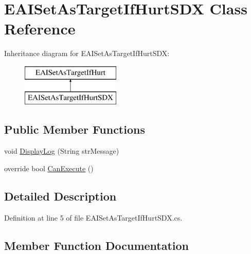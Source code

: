 \hypertarget{class_e_a_i_set_as_target_if_hurt_s_d_x}{}\section{E\+A\+I\+Set\+As\+Target\+If\+Hurt\+S\+DX Class Reference}
\label{class_e_a_i_set_as_target_if_hurt_s_d_x}
Inheritance diagram for E\+A\+I\+Set\+As\+Target\+If\+Hurt\+S\+DX\+:\begin{figure}[H]
\begin{center}
\leavevmode
\includegraphics[height=2.000000cm]{class_e_a_i_set_as_target_if_hurt_s_d_x}
\end{center}
\end{figure}
\subsection*{Public Member Functions}
\begin{DoxyCompactItemize}
\item 
void \mbox{\hyperlink{class_e_a_i_set_as_target_if_hurt_s_d_x_a7a96f5a8642f0efafd0845e8fb5835d5}{Display\+Log}} (String str\+Message)
\item 
override bool \mbox{\hyperlink{class_e_a_i_set_as_target_if_hurt_s_d_x_a2cf8d94771fac53145b8361e2cb929e3}{Can\+Execute}} ()
\end{DoxyCompactItemize}


\subsection{Detailed Description}


Definition at line 5 of file E\+A\+I\+Set\+As\+Target\+If\+Hurt\+S\+D\+X.\+cs.



\subsection{Member Function Documentation}
\mbox{\label{class_e_a_i_set_as_target_if_hurt_s_d_x_a2cf8d94771fac53145b8361e2cb929e3}} 
